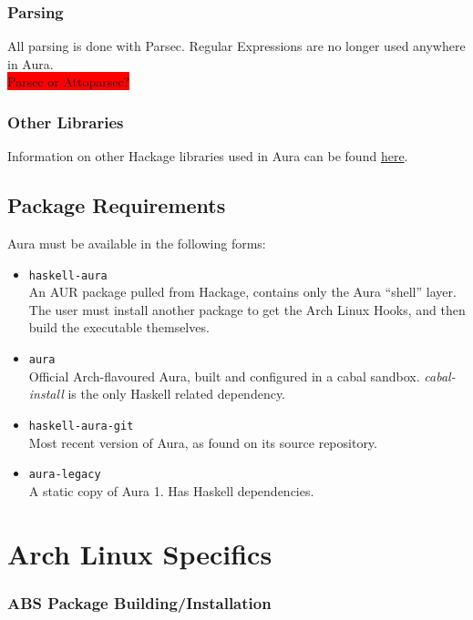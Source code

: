 \documentclass{article}
\begin{document}
\subsubsection{Parsing}
All parsing is done with Parsec. Regular Expressions are no longer used
anywhere in Aura.\\
\colorbox{Red}{Parsec or Attoparsec?}

\subsubsection{Other Libraries}\label{other-libraries}
Information on other Hackage libraries used in Aura can be found
\href{https://github.com/fosskers/aura/issues/223}{here}.

\subsection{Package Requirements}\label{package-requirements}
Aura must be available in the following forms:
\begin{itemize}
  \item \texttt{haskell-aura}\\
    An AUR package pulled from Hackage, contains only the Aura ``shell'' layer.
    The user must install another package to get the Arch Linux Hooks, and
    then build the executable themselves.
  \item \texttt{aura}\\ Official Arch-flavoured Aura, built and configured
    in a cabal sandbox. \emph{cabal-install} is the only Haskell related
    dependency.
  \item \texttt{haskell-aura-git}\\ Most recent version of Aura, as found
    on its source repository.
  \item \texttt{aura-legacy}\\
    A static copy of Aura 1. Has Haskell dependencies.
\end{itemize}


\section{Arch Linux Specifics}\label{arch-linux-specifics}

\subsubsection{ABS Package
Building/Installation}\label{abs-package-buildinginstallation}
\end{document}

